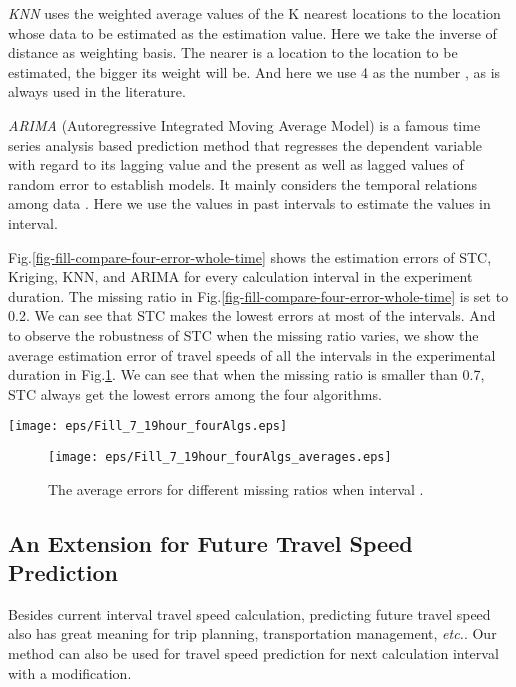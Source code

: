\documentclass[twocolumn,10pt,final,conference]{IEEEtran}
\def\etc{\textit{etc.}\xspace}
\begin{document}
\emph{KNN} uses the weighted average values of the K nearest locations to the location whose data to be estimated as the estimation value. Here we take the inverse of distance as weighting basis. The nearer is a location to the location to be estimated, the bigger its weight will be. And here we use 4 as the number , as is always used in the literature.

\emph{ARIMA} (Autoregressive Integrated Moving Average Model) is a famous time series analysis based prediction method that regresses the dependent variable with regard to its lagging value and the present as well as lagged values of random error to establish models. It mainly considers the temporal relations among data \cite{Ref83}. Here we use the values in past  intervals to estimate the values in  interval.

Fig.\ref{fig-fill-compare-four-error-whole-time} shows the estimation errors of STC, Kriging, KNN, and ARIMA for every calculation interval in the experiment duration. The missing ratio in Fig.\ref{fig-fill-compare-four-error-whole-time} is set  to 0.2.  We can see that STC makes the lowest errors at most of the intervals.
And to observe the robustness of STC when the missing ratio varies, we show the average estimation error of travel speeds of all the intervals in the experimental duration in Fig.\ref{fig-fill-compare-four-error-fill-average}.  We can see that when the missing ratio is smaller than 0.7, STC always get the lowest errors among the four algorithms.
\begin{figure*}[t]
  \centering
  \texttt{[image: eps/Fill\_7\_19hour\_fourAlgs.eps]}\\
  \caption{The comparison of filling-up errors among four estimation methods during 7:00-16:00 April 24th, 2011. The missing ratio is 0.2. And .}
  \label{fig-fill-compare-four-error-whole-time}
\end{figure*}

\begin{figure}[h]
  \centering
\texttt{[image: eps/Fill\_7\_19hour\_fourAlgs\_averages.eps]}\\
  \caption{The average errors for different missing ratios when interval .}
  \label{fig-fill-compare-four-error-fill-average}
\end{figure}



\subsection{An Extension for Future Travel Speed Prediction}
Besides current interval travel speed calculation, predicting future travel speed  also has great meaning for trip planning, transportation management, \etc. Our method can also be used for travel speed prediction for next calculation interval with a modification.
\end{document}
